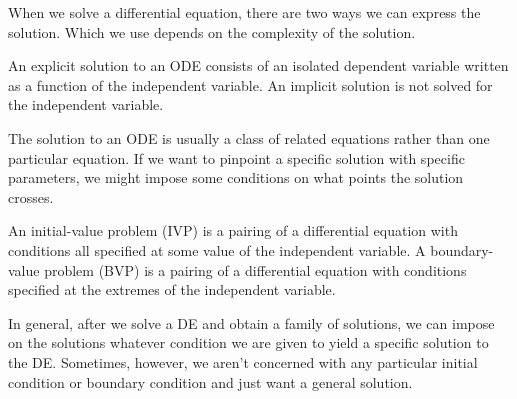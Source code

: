 \documentclass[../m082main.tex]{subfiles}
\begin{document}





When we solve a differential equation, there are two ways we can express the solution.
Which we use depends on the complexity of the solution.

\begin{definition}
    An explicit solution to an ODE consists of an isolated dependent variable written as a function of the independent variable.
    An implicit solution is not solved for the independent variable.
\end{definition}

The solution to an ODE is usually a class of related equations rather than one particular equation.
If we want to pinpoint a specific solution with specific parameters, we might impose some conditions on what points the solution crosses.

\begin{definition}
    An initial-value problem (IVP) is a pairing of a differential equation with conditions all specified at some value of the independent variable.
    A boundary-value problem (BVP) is a pairing of a differential equation with conditions specified at the extremes of the independent variable.
\end{definition}

In general, after we solve a DE and obtain a family of solutions, we can impose on the solutions whatever condition we are given to yield a specific solution to the DE.
Sometimes, however, we aren't concerned with any particular initial condition or boundary condition and just want a general solution.
\end{document}
